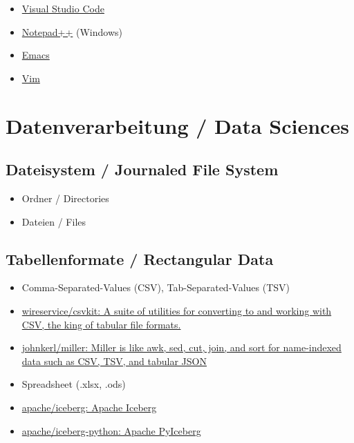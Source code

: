 \documentclass[
  ngerman,
  letterpaper,
]{scrbook}
\providecommand{\tightlist}{%
  \setlength{\itemsep}{0pt}\setlength{\parskip}{0pt}}
\begin{document}
\begin{itemize}
\tightlist
\item
  \href{https://code.visualstudio.com}{Visual Studio Code}
\item
  \href{https://notepad-plus-plus.org}{Notepad++} (Windows)
\item
  \href{https://www.gnu.org/software/emacs/}{Emacs}\\
\item
  \href{https://www.vim.org}{Vim}
\end{itemize}

\section{Datenverarbeitung / Data
Sciences}\label{datenverarbeitung-data-sciences}

\subsection{Dateisystem / Journaled File
System}\label{dateisystem-journaled-file-system}

\begin{itemize}
\tightlist
\item
  Ordner / Directories
\item
  Dateien / Files
\end{itemize}

\subsection{Tabellenformate / Rectangular
Data}\label{tabellenformate-rectangular-data}

\begin{itemize}
\tightlist
\item
  Comma-Separated-Values (CSV), Tab-Separated-Values (TSV)
\item
  \href{https://github.com/wireservice/csvkit}{wireservice/csvkit: A
  suite of utilities for converting to and working with CSV, the king of
  tabular file formats.}
\item
  \href{https://github.com/johnkerl/miller}{johnkerl/miller: Miller is
  like awk, sed, cut, join, and sort for name-indexed data such as CSV,
  TSV, and tabular JSON}
\item
  Spreadsheet (.xlsx, .ods)
\item
  \href{https://github.com/apache/iceberg?tab=readme-ov-file}{apache/iceberg:
  Apache Iceberg}
\item
  \href{https://github.com/apache/iceberg-python}{apache/iceberg-python:
  Apache PyIceberg}
\end{itemize}
\end{document}

